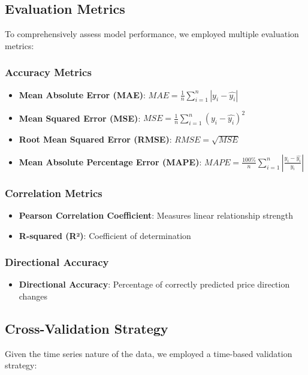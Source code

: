 \documentclass[11pt,a4paper]{article}
\begin{document}
\subsection{Evaluation Metrics}

To comprehensively assess model performance, we employed multiple evaluation metrics:

\subsubsection{Accuracy Metrics}
\begin{itemize}
    \item \textbf{Mean Absolute Error (MAE)}: $MAE = \frac{1}{n}\sum_{i=1}^{n}|y_i - \hat{y_i}|$
    \item \textbf{Mean Squared Error (MSE)}: $MSE = \frac{1}{n}\sum_{i=1}^{n}(y_i - \hat{y_i})^2$
    \item \textbf{Root Mean Squared Error (RMSE)}: $RMSE = \sqrt{MSE}$
    \item \textbf{Mean Absolute Percentage Error (MAPE)}: $MAPE = \frac{100\%}{n}\sum_{i=1}^{n}\left|\frac{y_i - \hat{y_i}}{y_i}\right|$
\end{itemize}

\subsubsection{Correlation Metrics}
\begin{itemize}
    \item \textbf{Pearson Correlation Coefficient}: Measures linear relationship strength
    \item \textbf{R-squared (R²)}: Coefficient of determination
\end{itemize}

\subsubsection{Directional Accuracy}
\begin{itemize}
    \item \textbf{Directional Accuracy}: Percentage of correctly predicted price direction changes
\end{itemize}

\subsection{Cross-Validation Strategy}

Given the time series nature of the data, we employed a time-based validation strategy:
\end{document}
